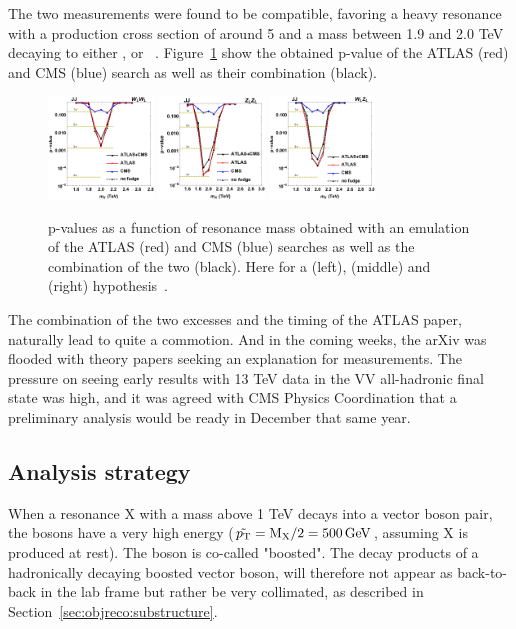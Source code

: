 The two measurements were found to be compatible, favoring a heavy resonance with a production cross section of around 5 \fbinv and a mass between 1.9 and 2.0 TeV decaying to either \PW\PW, \PW\PZ or \PZ\PZ~\cite{Dias:2015mhm}. Figure~\ref{fig:searchI:8tevcombo} show the obtained p-value of the ATLAS (red) and CMS (blue) search as well as their combination (black).  

\begin{figure}[ht] 
    \centering
    \includegraphics[width=0.25\textwidth]{figures/analysis/search1/misc/CMS_ATLAS_BulkWW_JJ_dijetfit_p.png}
    \includegraphics[width=0.25\textwidth]{figures/analysis/search1/misc/CMS_ATLAS_BulkZZ_JJ_dijetfit_p.png}
    \includegraphics[width=0.25\textwidth]{figures/analysis/search1/misc/CMS_ATLAS_WZ_JJ_dijetfit_p.png}
    \caption{p-values as a function of resonance mass obtained with an emulation of the ATLAS (red) and CMS (blue) searches as well as the combination of the two (black). Here for a \PW\PW (left), \PW\PZ (middle) and \PZ\PZ (right) hypothesis~\cite{Dias:2015mhm}.}
    \label{fig:searchI:8tevcombo}
\end{figure}

The combination of the two excesses and the timing of the ATLAS paper, naturally lead to quite a commotion. And in the coming weeks, the arXiv was flooded with theory papers seeking an explanation for measurements.
The pressure on seeing early results with 13 TeV data in the VV all-hadronic final state was high, and it was agreed with CMS Physics Coordination that a preliminary analysis would be ready in December that same year.

\subsection{Analysis strategy}

When a resonance X with a mass above 1 TeV decays into a vector boson pair, the bosons have a very high energy ($\tilde{p_{\mathrm{T}}}=\text{M}_{\text{X}}/2=500 \,\text{Ge\hspace{-.08em}V}$, assuming X is produced at rest). The boson is co-called "boosted".
The decay products of a hadronically decaying boosted vector boson, will therefore not appear as back-to-back in the lab frame but rather be very collimated, as described in Section~\ref{sec:objreco:substructure}.
